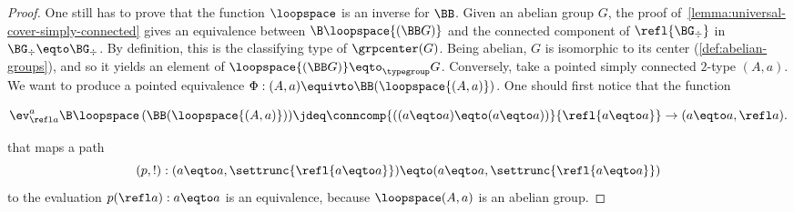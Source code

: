 \begin{proof}
  One still has to prove that the function $\loopspace$ is an inverse
  for $\BB$. Given an abelian group $G$, the proof
  of~\cref{lemma:universal-cover-simply-connected} gives an
  equivalence between $\B\loopspace {(\BB G)}$ and the connected
  component of $\refl {\BG_\div}$ in $\BG_\div\eqto \BG_\div$. By
  definition, this is the classifying type of $\grpcenter(G)$. Being
  abelian, $G$ is isomorphic to its center
  (\cref{def:abelian-groups}), and so it yields an element of
  $\loopspace {(\BB G)} \eqto_{\typegroup} G$. %
  Conversely, take a pointed simply connected $2$-type $(A,a)$. We
  want to produce a pointed equivalence
  $\Phi : (A,a) \equivto \BB (\loopspace {(A,a)}) $. One should first
  notice that the function
  \begin{fullwidth}
    \begin{equation}
      \label{eq:loopspace-A-abelian}%
      \ev^a_{\refl a}{\B\loopspace \left( \BB (\loopspace {(A,a)}) \right)}
      \jdeq \conncomp{((a\eqto a)\eqto (a\eqto a))}{\refl{a\eqto a}} \to (a\eqto a,\refl a).
    \end{equation}
  \end{fullwidth}
  that maps a path
  \begin{displaymath}
    (p,!):(a\eqto a,\settrunc{\refl{a\eqto a}})\eqto (a\eqto a,\settrunc{\refl{a\eqto a}})
  \end{displaymath}
  to the evaluation $p(\refl a): a\eqto a$ is an equivalence, because
  $\loopspace (A,a)$ is an abelian group.


\end{proof}
